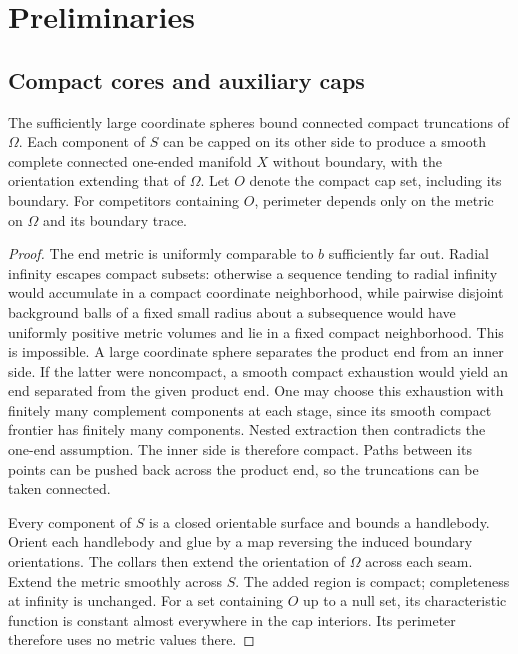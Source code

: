 \section{Preliminaries}
\label{sec:preliminaries}

\subsection{Compact cores and auxiliary caps}

\begin{lemma}\label{lem:compact-core}
The sufficiently large coordinate spheres bound connected compact
truncations of $\Omega$. Each component of $S$ can be capped on its
other side to produce a smooth complete connected one-ended manifold
$X$ without boundary, with the orientation extending that of $\Omega$.
Let $O$ denote the compact cap set, including its
boundary. For competitors containing $O$, perimeter depends only on
the metric on $\Omega$ and its boundary trace.
\end{lemma}
\begin{proof}
The end metric is uniformly comparable to $b$ sufficiently far out.
Radial infinity escapes compact subsets: otherwise a sequence tending
to radial infinity would accumulate in a compact coordinate
neighborhood, while pairwise disjoint background balls of a fixed small
radius about a subsequence would have uniformly positive metric
volumes and lie in a fixed compact neighborhood. This is impossible.
A large coordinate sphere separates the product end from an inner
side. If the latter were noncompact, a smooth compact exhaustion would
yield an end separated from the given product end. One may choose this
exhaustion with finitely many complement components at each stage,
since its smooth compact frontier has finitely many components.
Nested extraction then contradicts the one-end assumption. The inner
side is therefore compact. Paths between its points can be pushed
back across the product end, so the truncations can be taken connected.

Every component of $S$ is a closed orientable surface and bounds a
handlebody. Orient each handlebody and glue by a map reversing the
induced boundary orientations.  The collars then extend the orientation
of $\Omega$ across each seam. Extend the metric smoothly across $S$.
The added region is compact; completeness
at infinity is unchanged. For a set containing $O$ up to a null set,
its characteristic function is constant almost everywhere in the
cap interiors. Its perimeter therefore uses no metric values there.
\end{proof}

